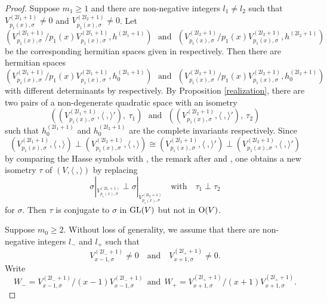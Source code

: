 \documentclass[12pt]{amsart}
\begin{document}
\begin{proof}
\medskip

Suppose $m_1\geq 1$ and there are non-negative integers $l_1\neq l_2$ such that $V_{p_1(x), \sigma}^{(2l_1+1)} \neq 0$ and $V_{p_1(x), \sigma}^{(2l_2+1)} \neq 0$. Let $$( V_{p_1(x), \sigma}^{(2l_1+1)} / p_1(x) V_{p_1(x), \sigma}^{(2l_1+1)} ,  h^{(2l_1+1)} ) \ \ \ \text{and} \ \ \ ( V_{p_1(x), \sigma}^{(2l_2+1)} / p_1(x) V_{p_1(x), \sigma}^{(2l_2+1)} ,  h^{(2l_2+1)} ) $$ be the corresponding hermitian spaces given in \cite[Theorem 3.3]{Mil} respectively. Then there are hermitian spaces 
 $$( V_{p_1(x), \sigma}^{(2l_1+1)} / p_1(x) V_{p_1(x), \sigma}^{(2l_1+1)} ,  h_0^{(2l_1+1)} ) \ \ \ \text{and} \ \ \ ( V_{p_1(x), \sigma}^{(2l_2+1)} / p_1(x) V_{p_1(x), \sigma}^{(2l_2+1)} ,  h_0^{(2l_2+1)} ) $$
 with different determinants by \cite[Example 3, \S 1]{Mil} respectively. By Proposition \ref{realization},  there are two pairs of a non-degenerate quadratic space with an isometry
  $$((V_{p_1(x), \sigma}^{(2l_1+1)} , \langle \ , \rangle '), \  \tau_1) \ \ \ \text{and} \ \ \  ((V_{p_1(x), \sigma}^{(2l_2+1)} , \langle \ , \rangle '), \ \tau_2) $$ such that $h_0^{(2l_1+1)} $ and $h_0^{(2l_2+1)}$ are the complete invariants respectively.  Since 
 $$(V_{p_1(x), \sigma}^{(2l_1+1)} , \langle \ , \rangle )\perp (V_{p_1(x), \sigma}^{(2l_2+1)} , \langle \ , \rangle) \cong (V_{p_1(x), \sigma}^{(2l_1+1)} , \langle \ , \rangle ') \perp (V_{p_1(x), \sigma}^{(2l_2+1)} , \langle \ , \rangle ')$$ by comparing the Hasse symbols with \cite[58:3 Remark]{OM}, the remark after \cite[Theorem 3.3]{Mil} and \cite[Theorem 2.7]{Mil}, one obtains a new isometry $\tau$ of $(V, \langle \ , \rangle)$ by replacing $$\sigma |_{V_{p_1(x), \sigma}^{(2l_1+1)}} \perp \sigma |_{V_{p_1(x), \sigma}^{(2l_2+1)}} \ \ \ \text{ with } \ \ \ \tau_1\perp \tau_2$$ for $\sigma$. Then $\tau$ is conjugate to $\sigma$ in ${\rm GL}(V)$ but not in ${\rm O}(V)$. 
 
 
 \medskip
 
 Suppose $m_0\geq 2$. Without loss of generality, we assume that there are non-negative integers $l_{-}$ and $l_{+}$ such that $$V_{x-1, \sigma}^{(2l_{-}+1)} \neq 0 \ \ \ \text{ and } \ \ \ V_{x+1, \sigma}^{(2l_{+}+1)} \neq 0 . $$ Write 
 $$ W_-= V_{x-1, \sigma}^{(2l_{-}+1)}/(x-1)V_{x-1, \sigma}^{(2l_{-}+1)}  \ \ \text{and}  \ \ W_+= V_{x+1, \sigma}^{(2l_{+}+1)}/(x+1)V_{x+1, \sigma}^{(2l_{+}+1)} .$$


\end{proof}
\end{document}
